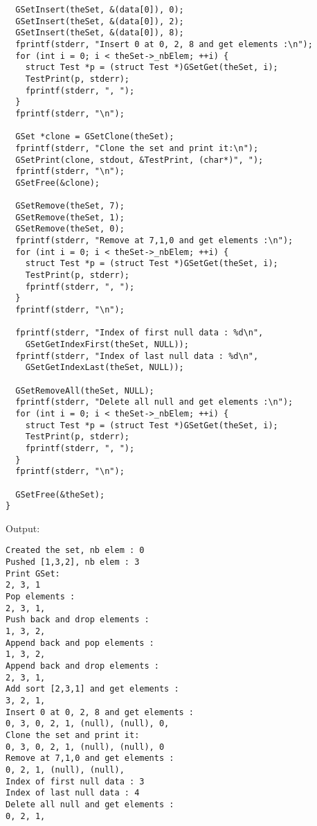 \documentclass[12pt, a4paper]{article}
\begin{document}
\begin{scriptsize}
\begin{ttfamily}
\begin{lstlisting}
  GSetInsert(theSet, &(data[0]), 0);
  GSetInsert(theSet, &(data[0]), 2);
  GSetInsert(theSet, &(data[0]), 8);
  fprintf(stderr, "Insert 0 at 0, 2, 8 and get elements :\n");
  for (int i = 0; i < theSet->_nbElem; ++i) {
    struct Test *p = (struct Test *)GSetGet(theSet, i);
    TestPrint(p, stderr);
    fprintf(stderr, ", ");
  }
  fprintf(stderr, "\n");

  GSet *clone = GSetClone(theSet);
  fprintf(stderr, "Clone the set and print it:\n");
  GSetPrint(clone, stdout, &TestPrint, (char*)", ");
  fprintf(stderr, "\n");
  GSetFree(&clone);

  GSetRemove(theSet, 7);
  GSetRemove(theSet, 1);
  GSetRemove(theSet, 0);
  fprintf(stderr, "Remove at 7,1,0 and get elements :\n");
  for (int i = 0; i < theSet->_nbElem; ++i) {
    struct Test *p = (struct Test *)GSetGet(theSet, i);
    TestPrint(p, stderr);
    fprintf(stderr, ", ");
  }
  fprintf(stderr, "\n");

  fprintf(stderr, "Index of first null data : %d\n", 
    GSetGetIndexFirst(theSet, NULL));
  fprintf(stderr, "Index of last null data : %d\n", 
    GSetGetIndexLast(theSet, NULL));

  GSetRemoveAll(theSet, NULL);
  fprintf(stderr, "Delete all null and get elements :\n");
  for (int i = 0; i < theSet->_nbElem; ++i) {
    struct Test *p = (struct Test *)GSetGet(theSet, i);
    TestPrint(p, stderr);
    fprintf(stderr, ", ");
  }
  fprintf(stderr, "\n");

  GSetFree(&theSet);
}
\end{lstlisting}
\end{ttfamily}
\end{scriptsize}

Output:\\
\begin{scriptsize}
\begin{ttfamily}
\begin{lstlisting}
Created the set, nb elem : 0
Pushed [1,3,2], nb elem : 3
Print GSet:
2, 3, 1
Pop elements :
2, 3, 1, 
Push back and drop elements :
1, 3, 2, 
Append back and pop elements :
1, 3, 2, 
Append back and drop elements :
2, 3, 1, 
Add sort [2,3,1] and get elements :
3, 2, 1, 
Insert 0 at 0, 2, 8 and get elements :
0, 3, 0, 2, 1, (null), (null), 0, 
Clone the set and print it:
0, 3, 0, 2, 1, (null), (null), 0
Remove at 7,1,0 and get elements :
0, 2, 1, (null), (null), 
Index of first null data : 3
Index of last null data : 4
Delete all null and get elements :
0, 2, 1, 
\end{lstlisting}
\end{ttfamily}
\end{scriptsize}
\end{document}
